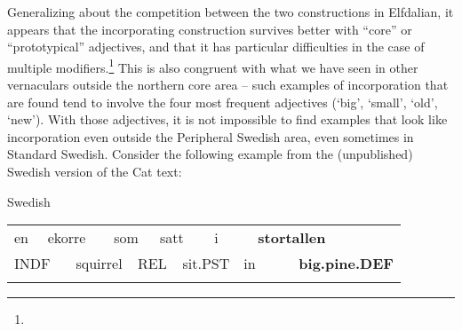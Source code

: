 \begin{styleBodytextC}
Generalizing about the competition between the two constructions in Elfdalian, it appears that the incorporating construction survives better with “core” or “prototypical” adjectives, and that it has particular difficulties in the case of multiple modifiers.\footnote{} This is also congruent with what we have seen in other vernaculars outside the northern core area – such examples of incorporation that are found tend to involve the four most frequent adjectives (‘big’, ‘small’, ‘old’, ‘new’). With those adjectives, it is not impossible to find examples that look like incorporation even outside the Peripheral Swedish area, even sometimes in Standard Swedish. Consider the following example from the (unpublished) Swedish version of the Cat text:

\end{styleBodytextC}

\begin{listWWNumileveli}
\item {}

\begin{styleExample}
Swedish

\end{styleExample}

\end{listWWNumileveli}

\begin{styleExText}

\end{styleExText}

\begin{tabular}{llllllllllll}
\lsptoprule
en & \multicolumn{2}{l}{ekorre

} & \multicolumn{2}{l}{som

} & \multicolumn{2}{l}{satt

} & \multicolumn{2}{l}{i

} & \multicolumn{2}{l}{{\bfseries stortallen}

} & \\
\multicolumn{2}{l}{INDF

} & \multicolumn{2}{l}{squirrel

} & \multicolumn{2}{l}{REL

} & \multicolumn{2}{l}{sit.PST

} & \multicolumn{2}{l}{in

} & \multicolumn{2}{l}{{\bfseries big.pine.DEF}

}\\
\lspbottomrule
\end{tabular}

